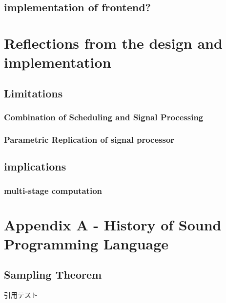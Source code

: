 \hypertarget{implementation-of-frontend}{%
\section{implementation of frontend?}\label{implementation-of-frontend}}

\hypertarget{reflections-from-the-design-and-implementation}{%
\chapter{Reflections from the design and
implementation}\label{reflections-from-the-design-and-implementation}}

\hypertarget{limitations}{%
\section{Limitations}\label{limitations}}

\hypertarget{combination-of-scheduling-and-signal-processing}{%
\subsection{Combination of Scheduling and Signal
Processing}\label{combination-of-scheduling-and-signal-processing}}

\hypertarget{parametric-replication-of-signal-processor}{%
\subsection{Parametric Replication of signal
processor}\label{parametric-replication-of-signal-processor}}

\hypertarget{implications}{%
\section{implications}\label{implications}}

\hypertarget{multi-stage-computation}{%
\subsection{multi-stage computation}\label{multi-stage-computation}}

\hypertarget{appendix-a---history-of-sound-programming-language}{%
\chapter{Appendix A - History of Sound Programming
Language}\label{appendix-a---history-of-sound-programming-language}}

\hypertarget{sampling-theorem-1}{%
\section{Sampling Theorem}\label{sampling-theorem-1}}

引用テスト\citep{Magnusson2009}
